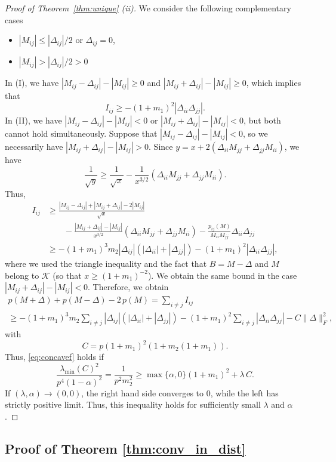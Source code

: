 \documentclass[12pt]{amsart}
\numberwithin{equation}{section}
\numberwithin{equation}{section}
\theoremstyle{plain}
\theoremstyle{definition}
\begin{document}
\begin{proof}[Proof of Theorem~\ref{thm:unique} (ii)]
We consider the following complementary cases
\begin{itemize}
    \item[(I)] $|M_{ij}|\leq |\Delta_{ij}|/2$ or $\Delta_{ij}=0$, 
    \item[(II)] $|M_{ij}|> |\Delta_{ij}|/2>0$  
\end{itemize}
In (I), we have $|M_{ij}-\Delta_{ij}|-|M_{ij}|\geq 0$ and $|M_{ij}+\Delta_{ij}|-|M_{ij}|\geq0$, which implies that 
\[
I_{ij}\geq -(1+m_1)^2|\Delta_{ii}\Delta_{jj}|.
\]
In (II), we have $|M_{ij}-\Delta_{ij}|-|M_{ij}|< 0$ or $|M_{ij}+\Delta_{ij}|-|M_{ij}|<0$, but both cannot hold simultaneously.  Suppose that $|M_{ij}-\Delta_{ij}|-|M_{ij}|< 0$, so we necessarily have $|M_{ij}+\Delta_{ij}|-|M_{ij}|>0$. Since $y=x + 2(\Delta_{ii}M_{jj}+\Delta_{jj}M_{ii})$, we have 
\[
\frac{1}{\sqrt{y}} \geq \frac{1}{\sqrt{x}}-\frac{1}{x^{3/2}}(\Delta_{ii}M_{jj}+\Delta_{jj}M_{ii}). 
\]
Thus,
\begin{align*}
I_{ij}& \geq \frac{|M_{ij}-\Delta_{ij}|+|M_{ij}+\Delta_{ij}|-2|M_{ij}|}{\sqrt{x}}\\
& \qquad-\frac{|M_{ij}+\Delta_{ij}|-|M_{ij}|}{x^{3/2}}(\Delta_{ii}M_{jj}+\Delta_{jj}M_{ii}) 
- \frac{p_{ij}(M)}{M_{ii}M_{jj}}\Delta_{ii}\Delta_{jj}\\
& \geq -(1+m_1)^3 m_2 |\Delta_{ij}|(|\Delta_{ii}|+|\Delta_{jj}|)  - (1+m_1)^2 |\Delta_{ii}\Delta_{jj}|, \end{align*}
where we used the triangle inequality and the fact that $B=M-\Delta$ and $M$ belong to $\mathcal{K}$ (so that $x\geq (1+m_1)^{-2}$). We obtain the same bound in the case $|M_{ij}+\Delta_{ij}|-|M_{ij}|<0$. 
Therefore, we obtain
\begin{multline*}
p(M+\Delta)   +     p(M-\Delta) - 2\, p(M) = \sum_{i\neq j}I_{ij}\\
\geq - (1+m_1)^3 m_2  \sum_{i\neq j} |\Delta_{ij}|(|\Delta_{ii}|+|\Delta_{jj}|)  - (1+m_1)^2 \sum_{i\neq j} |\Delta_{ii}\Delta_{jj}| -C \|\Delta\|_F^2,
\end{multline*}
with
\[
C = p(1+m_1)^2(1+m_2(1+m_1)).
\]
Thus, \eqref{eq:concavef} holds if 
\[
\frac{\lambda_{\min}(C)^2}{p^4 (1-\alpha)^2}=\frac{1}{p^2 m_2^2} \geq \max\{\alpha,0\}(1+m_1)^2 + \lambda\, C.
\]
If $(\lambda,\alpha)\to(0,0)$, the right hand side converges to $0$, while the left has strictly positive limit. Thus, this inequality holds for sufficiently small $\lambda$ and $\alpha$. 
\end{proof}

\subsection{Proof of Theorem \ref{thm:conv_in_dist}}
\end{document}
